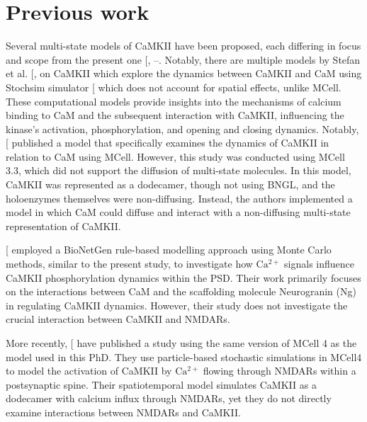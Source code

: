 \documentclass[
  11pt,
  letterpaper,
]{scrreprt}
\begin{document}
\section{Previous work}\label{previous-work}

Several multi-state models of CaMKII have been proposed, each differing
in focus and scope from the present one
{[},
--\citeproc{ref-bartol2024Spatial}{437}{]}.
Notably, there are multiple models by Stefan et al.
{[},
\citeproc{ref-stefan2011MultiStage}{434}{]} on CaMKII which explore the
dynamics between CaMKII and CaM using Stochsim simulator
{[}\citeproc{ref-lenovere2001StochSim}{439}{]} which does not account
for spatial effects, unlike MCell. These computational models provide
insights into the mechanisms of calcium binding to CaM and the
subsequent interaction with CaMKII, influencing the kinase's activation,
phosphorylation, and opening and closing dynamics. Notably,
{[}\citeproc{ref-pharris2019Multistate}{185}{]} published a model that
specifically examines the dynamics of CaMKII in relation to CaM using
MCell. However, this study was conducted using MCell 3.3, which did not
support the diffusion of multi-state molecules. In this model, CaMKII
was represented as a dodecamer, though not using BNGL, and the
holoenzymes themselves were non-diffusing. Instead, the authors
implemented a model in which CaM could diffuse and interact with a
non-diffusing multi-state representation of CaMKII.

{[}\citeproc{ref-ordyan2020Interactions}{436}{]} employed a BioNetGen
rule-based modelling approach using Monte Carlo methods, similar to the
present study, to investigate how \(\mathrm{Ca^{2+}}\) signals influence
CaMKII phosphorylation dynamics within the PSD. Their work primarily
focuses on the interactions between CaM and the scaffolding molecule
Neurogranin (Ng) in regulating CaMKII dynamics. However, their study
does not investigate the crucial interaction between CaMKII and NMDARs.

More recently, {[}\citeproc{ref-bartol2024Spatial}{437}{]} have
published a study using the same version of MCell 4 as the model used in
this PhD. They use particle-based stochastic simulations in MCell4 to
model the activation of CaMKII by \(\mathrm{Ca^{2+}}\) flowing through
NMDARs within a postsynaptic spine. Their spatiotemporal model simulates
CaMKII as a dodecamer with calcium influx through NMDARs, yet they do
not directly examine interactions between NMDARs and CaMKII.
\end{document}
